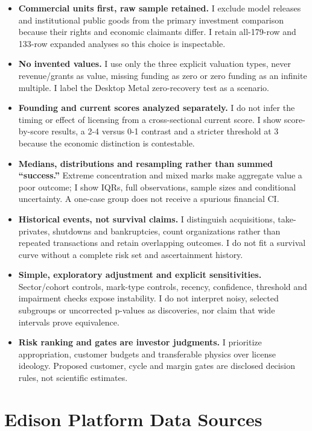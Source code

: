 \documentclass{article}
\begin{document}
\begin{itemize}
\tightlist
\item
  \textbf{Commercial units first, raw sample retained.} I exclude model
  releases and institutional public goods from the primary investment
  comparison because their rights and economic claimants differ. I
  retain all-179-row and 133-row expanded analyses so this choice is
  inspectable.
\item
  \textbf{No invented values.} I use only the three explicit valuation
  types, never revenue/grants as value, missing funding as zero or zero
  funding as an infinite multiple. I label the Desktop Metal
  zero-recovery test as a scenario.
\item
  \textbf{Founding and current scores analyzed separately.} I do not
  infer the timing or effect of licensing from a cross-sectional current
  score. I show score-by-score results, a 2-4 versus 0-1 contrast and a
  stricter threshold at 3 because the economic distinction is
  contestable.
\item
  \textbf{Medians, distributions and resampling rather than summed
  ``success.''} Extreme concentration and mixed marks make aggregate
  value a poor outcome; I show IQRs, full observations, sample sizes and
  conditional uncertainty. A one-case group does not receive a spurious
  financial CI.
\item
  \textbf{Historical events, not survival claims.} I distinguish
  acquisitions, take-privates, shutdowns and bankruptcies, count
  organizations rather than repeated transactions and retain overlapping
  outcomes. I do not fit a survival curve without a complete risk set
  and ascertainment history.
\item
  \textbf{Simple, exploratory adjustment and explicit sensitivities.}
  Sector/cohort controls, mark-type controls, recency, confidence,
  threshold and impairment checks expose instability. I do not interpret
  noisy, selected subgroups or uncorrected p-values as discoveries, nor
  claim that wide intervals prove equivalence.
\item
  \textbf{Risk ranking and gates are investor judgments.} I prioritize
  appropriation, customer budgets and transferable physics over license
  ideology. Proposed customer, cycle and margin gates are disclosed
  decision rules, not scientific estimates.
\end{itemize}

\clearpage
\section*{Edison Platform Data Sources}
\end{document}

